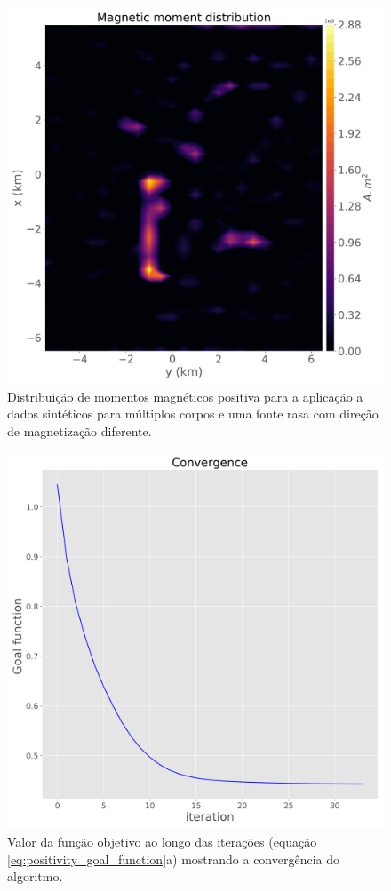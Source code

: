 \begin{figure}
	\centering
	\includegraphics[width=.9\textwidth]{Fig/eqlayer/unidir_shallow_diff_test/magnetic_moment_positive_LM_NNLS_magRM.png}
	\caption{Distribuição de momentos magnéticos positiva para a aplicação a dados sintéticos para múltiplos corpos e uma fonte rasa com direção de magnetização diferente.}
	\label{fig:dist_momentos_pos_3}
\end{figure}

\begin{figure}
	\centering
	\includegraphics[width=.9\textwidth]{Fig/eqlayer/unidir_shallow_diff_test/convergence_LM_NNLS_magRM.png}
	\caption{Valor da função objetivo ao longo das iterações (equação \ref{eq:positivity_goal_function}a) mostrando a convergência do algoritmo.}
	\label{fig:convergence_3}
\end{figure}

